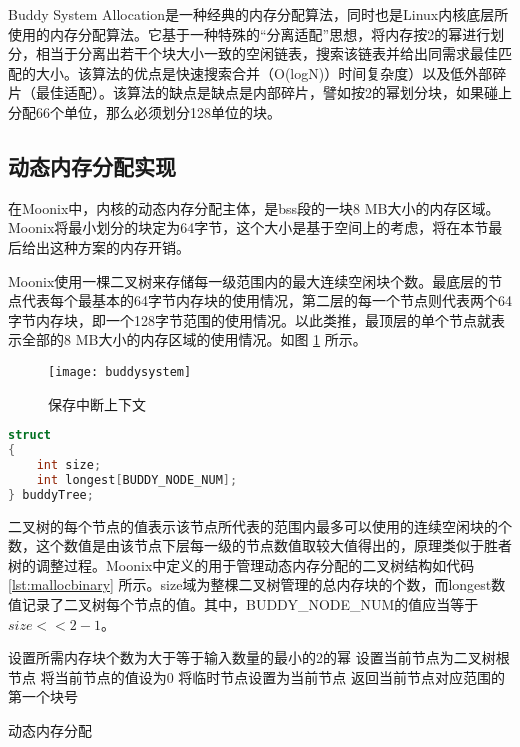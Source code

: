 Buddy System Allocation是一种经典的内存分配算法，同时也是Linux内核底层所使用的内存分配算法。它基于一种特殊的“分离适配”思想，将内存按2的幂进行划分，相当于分离出若干个块大小一致的空闲链表，搜索该链表并给出同需求最佳匹配的大小。该算法的优点是快速搜索合并（O(logN)）时间复杂度）以及低外部碎片（最佳适配）。该算法的缺点是缺点是内部碎片，譬如按2的幂划分块，如果碰上分配66个单位，那么必须划分128单位的块。

\subsection{动态内存分配实现}

在Moonix中，内核的动态内存分配主体，是bss段的一块8 MB大小的内存区域。Moonix将最小划分的块定为64字节，这个大小是基于空间上的考虑，将在本节最后给出这种方案的内存开销。

Moonix使用一棵二叉树来存储每一级范围内的最大连续空闲块个数。最底层的节点代表每个最基本的64字节内存块的使用情况，第二层的每一个节点则代表两个64字节内存块，即一个128字节范围的使用情况。以此类推，最顶层的单个节点就表示全部的8 MB大小的内存区域的使用情况。如图 \ref{pic:buddysystem} 所示。

\begin{figure}[htpb]
	\centering
	\texttt{[image: buddysystem]}
	\setlength{\abovecaptionskip}{2pt}
	\caption{保存中断上下文}
	\label{pic:buddysystem}
\end{figure}

\begin{lstlisting}[language={C}, caption={动态内存分配管理二叉树}, label={lst:mallocbinary}]
struct
{
	int size;
	int longest[BUDDY_NODE_NUM];
} buddyTree;
\end{lstlisting}

二叉树的每个节点的值表示该节点所代表的范围内最多可以使用的连续空闲块的个数，这个数值是由该节点下层每一级的节点数值取较大值得出的，原理类似于胜者树的调整过程。Moonix中定义的用于管理动态内存分配的二叉树结构如代码 \ref{lst:mallocbinary} 所示。size域为整棵二叉树管理的总内存块的个数，而longest数值记录了二叉树每个节点的值。其中，BUDDY\_NODE\_NUM的值应当等于$size<<2-1$。

\begin{algorithm}[H]
	
	设置所需内存块个数为大于等于输入数量的最小的2的幂\;
	设置当前节点为二叉树根节点\;
	将当前节点的值设为0\;
	将临时节点设置为当前节点\;
	返回当前节点对应范围的第一个块号\;
	\caption{动态内存分配}
	\label{alg:kalloc}
\end{algorithm}

